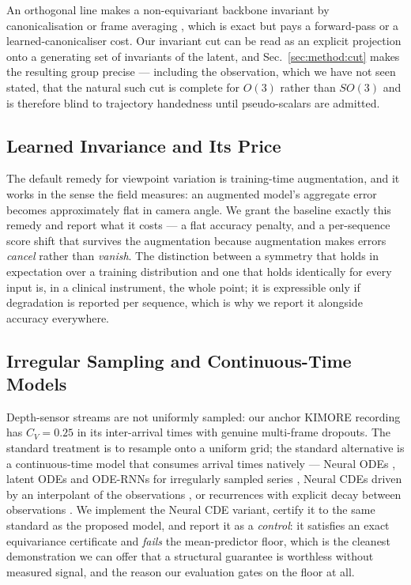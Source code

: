 \documentclass[10pt,journal]{IEEEtran}
\begin{document}
An orthogonal line makes a non-equivariant backbone invariant by canonicalisation or frame averaging \cite{puny2022frameaveraging}, which is exact but pays a forward-pass or a learned-canonicaliser cost. Our invariant cut can be read as an explicit projection onto a generating set of invariants of the latent, and Sec.~\ref{sec:method:cut} makes the resulting group precise --- including the observation, which we have not seen stated, that the natural such cut is complete for $O(3)$ rather than $SO(3)$ and is therefore blind to trajectory handedness until pseudo-scalars are admitted.

\subsection{Learned Invariance and Its Price}
The default remedy for viewpoint variation is training-time augmentation, and it works in the sense the field measures: an augmented model's aggregate error becomes approximately flat in camera angle. We grant the baseline exactly this remedy and report what it costs --- a flat accuracy penalty, and a per-sequence score shift that survives the augmentation because augmentation makes errors \emph{cancel} rather than \emph{vanish}. The distinction between a symmetry that holds in expectation over a training distribution and one that holds identically for every input is, in a clinical instrument, the whole point; it is expressible only if degradation is reported per sequence, which is why we report it alongside accuracy everywhere.

\subsection{Irregular Sampling and Continuous-Time Models}
Depth-sensor streams are not uniformly sampled: our anchor KIMORE recording has $C_V=0.25$ in its inter-arrival times with genuine multi-frame dropouts. The standard treatment is to resample onto a uniform grid; the standard alternative is a continuous-time model that consumes arrival times natively --- Neural ODEs \cite{chen2018neuralode}, latent ODEs and ODE-RNNs for irregularly sampled series \cite{rubanova2019odernn}, Neural CDEs driven by an interpolant of the observations \cite{kidger2020neuralcde}, or recurrences with explicit decay between observations \cite{che2018grud}. We implement the Neural CDE variant, certify it to the same standard as the proposed model, and report it as a \emph{control}: it satisfies an exact equivariance certificate and \emph{fails} the mean-predictor floor, which is the cleanest demonstration we can offer that a structural guarantee is worthless without measured signal, and the reason our evaluation gates on the floor at all.
\end{document}
